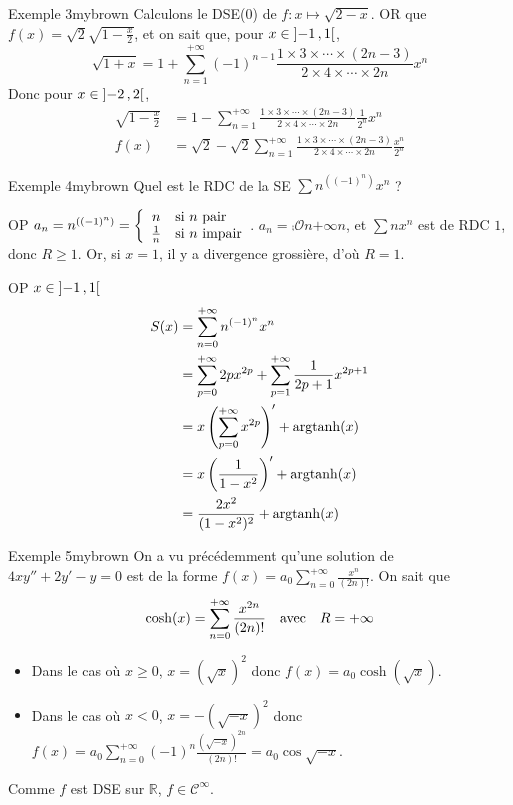     \begin{omed}{Exemple 3}{mybrown}
        Calculons le DSE(0) de $f : x \mapsto \sqrt{2-x}$. OR que $f(x) = \sqrt{2}\sqrt{1 - \frac{x}{2}}$, et on sait que, pour $x \in \left] -1 \, , 1 \right[$,
        \[ \sqrt{1 + x} = 1 + \sum_{n=1}^{+\infty} (-1)^{n-1} \frac{1 \times 3 \times \cdots \times (2n-3)}{2 \times 4 \times \cdots \times 2n} x^n \] 
        Donc pour $x \in \left] -2 \, , 2 \right[$, 
        \begin{align*}
            \sqrt{1 - \frac{x}{2}} 
            &= 1 - \sum_{n=1}^{+\infty} \frac{1 \times 3 \times \cdots \times (2n-3)}{2 \times 4 \times \cdots \times 2n} \frac{1}{2^n} x^n \\
            f(x) 
            &= \sqrt{2} - \sqrt{2} \sum_{n=1}^{+\infty} \frac{1 \times 3 \times \cdots \times (2n-3)}{2 \times 4 \times \cdots \times 2n} \frac{x^n}{2^n}
        \end{align*}  
    \end{omed}

    \begin{omed}{Exemple 4}{mybrown}
        Quel est le RDC de la SE $\sum n^{((-1)^n)} x^n$ ? 

        OP $a_n = n^{((-1)^n)} = \sisi{n}{n \text{ pair}}{\frac{1}{n}}{n \text{ impair}}$. $a_n = \comp{\mathcal{O}}{n}{+\infty}{n}$, et $\sum n x^n$ est de RDC $1$, donc $R \geq 1$. Or, si $x = 1$, il y a divergence grossière, d’où $R = 1$.

        OP $x \in \left] -1 \, , 1 \right[$
        \begin{align*}
            S(x) 
            &= \sum_{n=0}^{+\infty} n^{(-1)^n} x^n \\
            &= \sum_{p=0}^{+\infty} 2p x^{2p} + \sum_{p=1}^{+\infty} \frac{1}{2p+1} x^{2p+1} \\
            &= x\left(\sum_{p=0}^{+\infty} x^{2p}\right)' + \operatorname{argtanh}(x) \\
            &= x \left(\frac{1}{1 - x^2}\right)' + \operatorname{argtanh}(x) \\
            &= \frac{2x^2}{(1 - x^2)^2} + \operatorname{argtanh}(x)
        \end{align*}
    \end{omed}

    \begin{omed}{Exemple 5}{mybrown}
        On a vu précédemment qu’une solution de $4xy'' + 2 y' - y = 0$ est de la forme $f(x) = a_0 \sum_{n=0}^{+\infty} \frac{x^n}{(2n)!}$. On sait que 
        \[ \cosh(x) = \sum_{n=0}^{+\infty} \frac{x^{2n}}{(2n)!} \quad \text{avec} \quad R = +\infty \]    
        \begin{itemize}
            \item Dans le cas où $x \geq 0$, $x = \left(\sqrt{x}\right)^2$ donc $f(x) = a_0 \cosh(\sqrt{x})$. 
            \item Dans le cas où $x < 0$, $x = - \left(\sqrt{-x}\right)^2$ donc $f(x) = a_0 \sum_{n=0}^{+\infty} (-1)^n \frac{(\sqrt{-x})^{2n}}{(2n)!} = a_0 \cos\sqrt{-x}$.
        \end{itemize}
        Comme $f$ est DSE sur $\mathbb{R}$, $f \in \mathcal{C}^{\infty}$.
    \end{omed}

    



